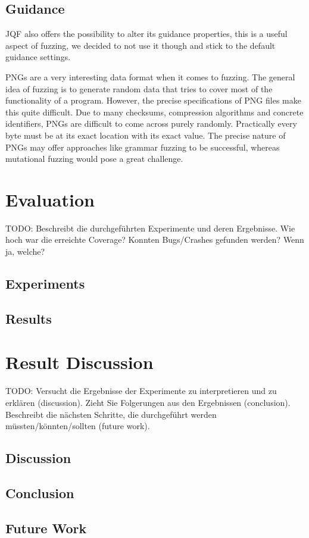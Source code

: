 \documentclass[runningheads]{llncs}
\begin{document}
\subsection{Guidance}
JQF also offers the possibility to alter its guidance properties, this is a useful aspect of fuzzing, we decided to not use it though and stick to the default guidance settings.

PNGs are a very interesting data format when it comes to fuzzing. The general idea of fuzzing is to generate random data that tries to cover most of the functionality of a program.
However, the precise specifications of PNG files make this quite difficult. 
Due to many checksums, compression algorithms and concrete identifiers, PNGs are difficult to come across purely randomly.
Practically every byte must be at its exact location with its exact value.
The precise nature of PNGs may offer approaches like grammar fuzzing to be successful, whereas mutational fuzzing would pose a great challenge.

\section{Evaluation}
TODO: Beschreibt die durchgeführten Experimente und deren Ergebnisse. Wie hoch war die erreichte Coverage? Konnten Bugs/Crashes gefunden werden? Wenn ja, welche?
\subsection{Experiments}
\subsection{Results}

\section{Result Discussion}
TODO: Versucht die Ergebnisse der Experimente zu interpretieren und zu erklären (discussion). Zieht Sie Folgerungen aus den Ergebnissen (conclusion). Beschreibt die nächsten Schritte, die durchgeführt werden müssten/könnten/sollten (future work).
\subsection{Discussion}
\subsection{Conclusion}
\subsection{Future Work}
\end{document}
